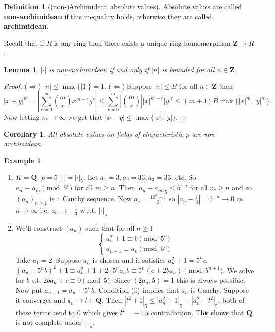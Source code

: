\documentclass[10pt,]{book}
\newcommand{\terminology}[1]{\textbf{#1}}
\theoremstyle{plain}
\newtheorem{corollary}[theorem]{Corollary}
\newtheorem{lemma}[theorem]{Lemma}
\theoremstyle{definition}
\newtheorem{definition}[theorem]{Definition}
\newtheorem{example}[theorem]{Example}
\newcommand{\QQ}{\mathbf{Q}}
\newcommand{\ZZ}{\mathbf{Z}}
\newcommand{\ab}{|\cdot|}
\begin{document}
\begin{definition}[(non-)Archimidean absolute values]\label{definition-2}
Absolute values are called \terminology{non-archimidean} if this inequality holds, otherwise they are called \terminology{archimidean}.
        \end{definition}
\par
Recall that if \(R\) is any ring then there exists a unique ring homomorphism \(\ZZ \to R\).%
\begin{lemma}\label{lemma-1}
\(\ab\) is non-archimidean if and only if \(|n|\) is bounded for all \(n \in \ZZ\).\end{lemma}
\begin{proof}

          (\(\Rightarrow\)) \(|n| \le \max\{|1|\} = 1\).\newline{}
          (\(\Leftarrow\)) Suppose \(|n| \le B\) for all \(n \in \ZZ\) then \[|x+ y|^m = \left| \sum_{r = 0}^{m} \binom{m}{r} x^{m-r}y^r\right| \le \sum_{r=0}^m\left|\binom{m}{r}\right||x|^{m-r}|y|^r \le (m+1)B \max\{|x|^m, |y|^m\}.\]
          Now letting \(m \to \infty\) we get that \(|x+y| \le \max\{|x|, |y|\}\).
        \end{proof}
\begin{corollary}\label{corollary-1}
All absolute values on fields of characteristic \(p\) are non-archimidean.\end{corollary}
\begin{example}\label{example-3}
\begin{enumerate}
\item{}\(K = \QQ\), \(p = 5\) \(\ab = \ab_5\).
            Let \(a_1 =3,a_2=33,a_3=33\), etc.
            So \(a_n \equiv a_m \pmod{5^n}\) for all \(m \ge n\).
            Then \(|a_n -a_m|_5 \le 5^{-n}\) for all \(m \ge n\) and so \((a_n)_{n\ge1}\) is a Cauchy sequence.
            Now \(a_n = \frac{10^n - 1}{3}\) so \(|a_n - \frac13| = 5^{-n}\to 0\) as \(n \to \infty\) i.e. \( a_n\to-\frac13\) w.r.t. \(\ab_5\)
          \item{}
            We'll construct \((a_n)\) such that for all \(n \ge 1\)
            \[
              \begin{cases}a_n^2 +1  \equiv 0 \pmod{5^n}\\
              a_{n+1} \equiv a_n \pmod{5^n}
              \end{cases}
            \]
            Take \(a_1 = 2\).
            Suppose \(a_n\) is chosen and it satisfies \(a_n^2  + 1 = 5^n c\).
            \((a_n + 5^n b)^2 + 1 \equiv a_n^2 + 1 + 2\cdot 5^n a_nb \equiv 5^n(c+2ba_n) \pmod{5^{n+1}}\).
            We solve for \(b\) s.t. \(2ba_n + c \equiv 0\pmod{5}\).
            Since \((2a_n,5) = 1\) this is always possible.
            Now put \(a_{n+1} = a_n+5^nb\).
            Condition (ii) implies that \(a_n\) is Cauchy.
            Suppose it converges and \(a_n\to l\in \QQ\).
            Then \(|l^2 + 1|_5 \le |a_n^2 + 1|_5 +|a_n^2 - l^2|_5\), both of these terms tend to 0 which gives \(l^2 = -1\) a contradiction.
            This shows that \(\QQ\) is not complete under \(\ab_5\).
          \end{enumerate}
\end{example}
\end{document}
